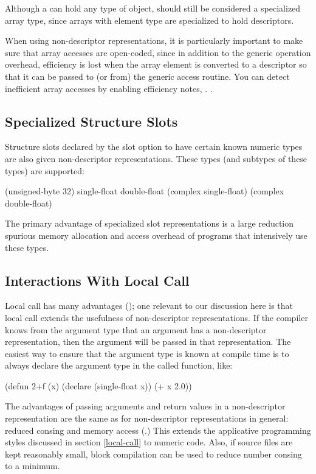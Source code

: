 Although a  can hold any type of object, \true{}
should still be considered a specialized array type, since arrays with
element type \true{} are specialized to hold descriptors.



When using non-descriptor representations, it is particularly
important to make sure that array accesses are open-coded, since in
addition to the generic operation overhead, efficiency is lost when
the array element is converted to a descriptor so that it can be
passed to (or from) the generic access routine.  You can detect
inefficient array accesses by enabling efficiency notes,
.  .


\subsection{Specialized Structure Slots}
\label{raw-slots}

Structure slots declared by the   slot option
to have certain known numeric types are also given non-descriptor
representations.  These types (and subtypes of these types) are supported:
\begin{lisp}
(unsigned-byte 32)
single-float
double-float
(complex single-float)
(complex double-float)
\end{lisp}

The primary advantage of specialized slot representations is a large
reduction spurious memory allocation and access overhead of programs
that intensively use these types.


\subsection{Interactions With Local Call}
\label{number-local-call}

Local call has many advantages (); one relevant to
our discussion here is that local call extends the usefulness of
non-descriptor representations.  If the compiler knows from the
argument type that an argument has a non-descriptor representation,
then the argument will be passed in that representation.  The easiest
way to ensure that the argument type is known at compile time is to
always declare the argument type in the called function, like:
\begin{lisp}
(defun 2+f (x)
  (declare (single-float x))
  (+ x 2.0))
\end{lisp}
The advantages of passing arguments and return values in a non-descriptor
representation are the same as for non-descriptor representations in general:
reduced consing and memory access (.)  This
extends the applicative programming styles discussed in section
\ref{local-call} to numeric code.  Also, if source files are kept reasonably
small, block compilation can be used to reduce number consing to a minimum.

